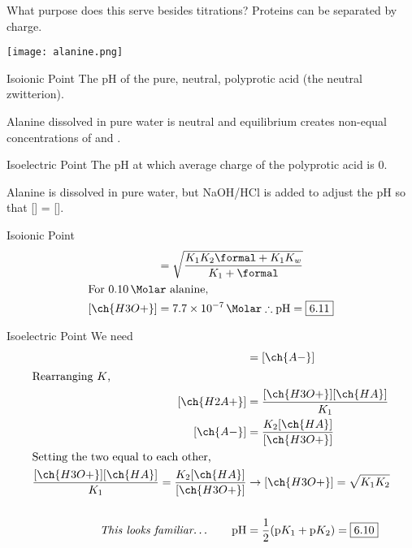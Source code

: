 \documentclass[handout]{beamer}
\begin{document}
\begin{frame}[allowframebreaks]{What purpose does this serve besides titrations?}
	Proteins can be separated by charge.
	\begin{center}
		\texttt{[image: alanine.png]}
	\end{center}

	\framebreak

	\begin{block}{Isoionic Point}
			The pH of the pure, neutral, polyprotic
			acid (the neutral zwitterion).
		\end{block}
		\begin{example}
			Alanine dissolved in pure water is neutral and
			equilibrium creates \alert{non-equal} concentrations of
			 and .
		\end{example}

		\medskip

		\begin{block}{Isoelectric Point}
			The pH at which average charge of the
			polyprotic acid is 0.
		\end{block}
		\begin{example}
		Alanine is dissolved in pure water, but NaOH/HCl is added to
		adjust the pH so that \alert{[] = [\ch{A-}]}.
		\end{example}
\end{frame}

\begin{frame}[t]{Isoionic Point}
	\begin{align*}
		[\ch{H3O+}] &= \sqrt{\frac{K_1K_2\si{\formal} +
		K_1K_w}{K_1 + \si{\formal}}} \\
		\intertext{For \SI{0.10}{\Molar} alanine,}
		[\ch{H3O+}] &= \SI{7.7e-7}{\Molar} \therefore
		\text{pH} = \fbox{6.11}
	\end{align*}
\end{frame}

\begin{frame}[t]{Isoelectric Point}
	We need
	\begin{align*}
		[\ch{H2A+}] &= [] \\
		\shortintertext{Rearranging $K$,}
		[\ch{H2A+}] &=
		\frac{[\ch{H3O+}][\ch{HA}]}{K_1} \\
		[\ch{A-}] &= \frac{K_2[\ch{HA}]}{[\ch{H3O+}]}
		\\
		\intertext{Setting the two equal to each
		other,} \frac{[\ch{H3O+}][\ch{HA}]}{K_1} =
		\frac{K_2[\ch{HA}]}{[\ch{H3O+}]} &\rightarrow
		[\ch{H3O+}] = \sqrt{K_1K_2} \\ \\
		\textit{This looks
		familiar\ldots}\qquad
		\text{pH} &= \frac{1}{2}(\text{p}K_1 +
		\text{p}K_2) = \fbox{6.10}
	\end{align*}
\end{frame}
\end{document}
